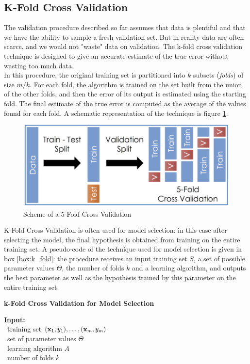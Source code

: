\documentclass[12pt]{report}
\theoremstyle{plain}
\begin{document}
\begin{flushleft}
\section{K-Fold Cross Validation}
The validation procedure described so far assumes that data is plentiful and 
that we have the ability to sample a fresh validation set. But in reality data 
are often scarce, and we would not "waste" data on validation. The k-fold cross 
validation technique is designed to give an accurate estimate of the true error 
without wasting too much data.\\
In this procedure, the original training set is partitioned into $k$ subsets 
(\textit{folds}) of size $m/k$. For each fold, the algorithm is trained on the 
set built from the union of the other folds, and then the error of its output 
is estimated using the starting fold. The final estimate of the true error is 
computed as the average of the values found for each fold. A schematic 
representation of the technique is figure \ref{ex:5_foldcross}.\\
\begin{figure}[!h]
	\centering
	\includegraphics[scale=0.6]{images/5_fold_cross_validation.pdf}
	\caption{Scheme of a 5-Fold Cross Validation}
	\label{ex:5_foldcross}
\end{figure}
K-Fold Cross Validation is often used for model selection: in this case after 
selecting the model, the final hypothesis is obtained from training on the 
entire training set. A pseudo-code of the technique used for model selection is 
given in box \ref{box:k_fold}: the procedure receives an input training set 
$S$, a set 
of possible parameter values $\Theta$, the number of folds $k$ and a learning 
algorithm, and outputs the best parameter as well as the hypothesis trained by 
this parameter on the entire training set.\\

\begin{tcolorbox}
	\begin{center}
		\textbf{k-Fold Cross Validation for Model Selection}
	\end{center}
	\textbf{Input:}\\
	\-\ training set $(\vb{x}_1,y_1),\dots,(\vb{x}_m,y_m)$\\
	\-\ set of parameter values $\Theta$\\
	\-\ learning algorithm $A$\\
	\-\ number of folds $k$\\
	 

\end{tcolorbox}
\end{flushleft}
\end{document}
